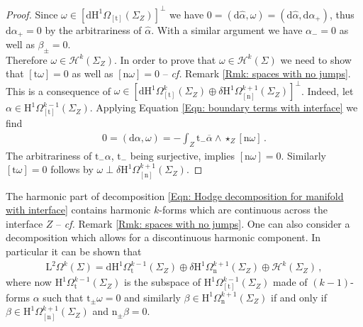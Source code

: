 \begin{proof}
	Since $\omega\in\left[\mathrm{d}\mathrm{H}^1\Omega_{[\mathrm{t}]}(\Sigma_Z)\right]^\perp$ we have $0=(\mathrm{d}\hat{\alpha},\omega)=(\mathrm{d}\hat{\alpha},\mathrm{d}\alpha_+)$, thus $\mathrm{d}\alpha_+=0$ by the arbitrariness of $\hat{\alpha}$.
	With a similar argument we have $\alpha_-=0$ as well as $\beta_\pm=0$.
	\\
	Therefore $\omega\in\mathcal{H}^k(\Sigma_Z)$.
	In order to prove that $\omega\in\mathcal{H}^k(\Sigma)$ we need to show that $[\mathrm{t}\omega]=0$ as well as $[\mathrm{n}\omega]=0$ -- \textit{cf.} Remark \ref{Rmk: spaces with no jumps}.
	This is a consequence of $\omega\in\left[\mathrm{d} \mathrm{H}^1\Omega^k_{[\mathrm{t}]}(\Sigma_Z)\oplus\delta \mathrm{H}^1\Omega^{k+1}_{[\mathrm{n}]}(\Sigma_Z)\right]^\perp$.
	Indeed, let $\alpha\in\mathrm{H}^1\Omega^{k-1}_{[\mathrm{t}]}(\Sigma_Z)$. Applying Equation \eqref{Eqn: boundary terms with interface} we find
	\begin{align}
		0=(\mathrm{d}\alpha,\omega)=-\int_Z\mathrm{t}_-\overline{\alpha}\wedge\star_Z[\mathrm{n}\omega]\,.
	\end{align}
	The arbitrariness of $\mathrm{t}_-\alpha$, $\mathrm{t}_-$ being surjective, implies $[\mathrm{n}\omega]=0$.
	Similarly $[\mathrm{t}\omega]=0$ follows by $\omega\perp\delta\mathrm{H}^1\Omega^{k+1}_{[\mathrm{n}]}(\Sigma_Z)$.
\end{proof}
\begin{remark}
	The harmonic part of decomposition \eqref{Eqn: Hodge decomposition for manifold with interface} contains harmonic $k$-forms which are continuous across the interface $Z$ -- \textit{cf.} Remark \ref{Rmk: spaces with no jumps}.
	One can also consider a decomposition which allows for a discontinuous harmonic component. In particular it can be shown that
	\begin{align*}
		\mathrm{L}^2\Omega^k(\Sigma)=
		\mathrm{d}\mathrm{H}^1\Omega^{k-1}_{\mathrm{t}}(\Sigma_Z)\oplus
		\delta\mathrm{H}^1\Omega^{k+1}_{\mathrm{n}}(\Sigma_Z)\oplus
		\mathcal{H}^k(\Sigma_Z)\,,
	\end{align*}
	where now $\mathrm{H}^1\Omega^{k-1}_{\mathrm{t}}(\Sigma_Z)$ is the subspace of $\mathrm{H}^1\Omega^{k-1}_{[\mathrm{t}]}(\Sigma_Z)$ made of $(k-1)$-forms $\alpha$ such that $\mathrm{t}_\pm\omega=0$ and similarly $\beta\in\mathrm{H}^1\Omega^{k+1}_{\mathrm{n}}(\Sigma_Z)$ if and only if $\beta\in\mathrm{H}^1\Omega^{k+1}_{[\mathrm{n}]}(\Sigma_Z)$ and $\mathrm{n}_\pm\beta=0$.
\end{remark}

